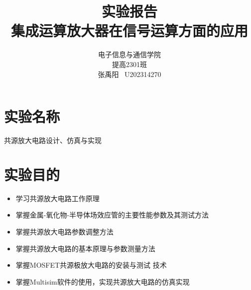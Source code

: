\documentclass[a4paper,11pt,UTF8]{article}
\numberwithin{equation}{subsection}
\begin{document}
\title{\huge 实验报告 \\ 集成运算放大器在信号运算方面的应用}
\author{电子信息与通信学院 \\ 提高2301班 \\ 张禹阳 \ U202314270}

\maketitle

\begin{figure}[H]
	\centering
\end{figure}

\tableofcontents\newpage
\section{实验名称}
共源放大电路设计、仿真与实现
\section{实验目的}
\begin{itemize}
	\item 学习共源放大电路工作原理
	\item 掌握金属-氧化物-半导体场效应管的主要性能参数及其测试方法
	\item 掌握共源放大电路参数调整方法
	\item 掌握共源放大电路的基本原理与参数测量方法
	\item 掌握MOSFET共源极放大电路的安装与测试 技术
	\item 掌握Multisim软件的使用，实现共源放大电路的仿真实现
\end{itemize}
\end{document}
